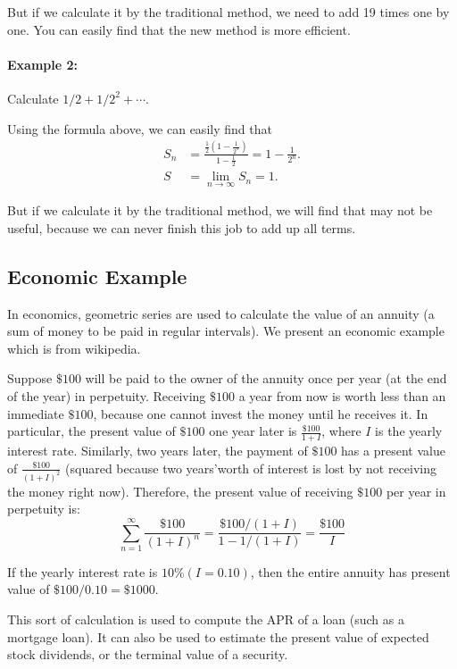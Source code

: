 But if we calculate it by the traditional method, we need to add 19 times one by one. You can easily find that the new method is more efficient. 

\paragraph{Example 2:} Calculate $1/2+1/2^2+\cdots$.

Using the formula above, we can easily find that
\begin{equation*}
    \begin{aligned}
        S_{n} &= \frac{\frac{1}{2}\left(1-\frac{1}{2^{n}}\right)}{1-\frac{1}{2}} = 1 - \frac{1}{2^{n}}. \\
        S &= \lim_{n\to\infty} S_n = 1.
    \end{aligned}
\end{equation*}

But if we calculate it by the traditional method, we will find that may not be useful, because we can never finish this job to add up all terms.


\subsection{Economic Example}
In economics, geometric series are used to calculate the value of an annuity (a sum of money to be paid in regular intervals). We present an economic example which is from wikipedia. 

Suppose $\$100$ will be paid to the owner of the annuity once per year (at the end of the year) in perpetuity. Receiving $\$100$ a year from now is worth less than an immediate $\$100$, because one cannot invest the money until he receives it. In particular, the present value of $\$100$ one year later is $\frac{{\$100}}{{1 + I}}$, where $I$ is the yearly interest rate. Similarly, two years later, the payment of $\$100$ has a present value of  $\frac{{\$100}}{{(1 + I)}^2}$ (squared because two years'worth of interest is lost by not receiving the money right now). Therefore, the present value of receiving $\$100$ per year in perpetuity is:
\[
    \sum_{n=1}^\infty  {\frac{{\$100}}{{{{\left( {1 + I} \right)}^{n }}}}}  = \frac{{\$100/\left( {1+I} \right)}}{{1 - 1/\left( {1 + I} \right)}} = \frac{{\$100}}{I}
\]

If the yearly interest rate is $10\%(I=0.10)$, then the entire annuity has present value of $\$100/0.10=\$1000$.

This sort of calculation is used to compute the APR of a loan (such as a mortgage loan). It can also be used to estimate the present value of expected stock dividends, or the terminal value of a security.



